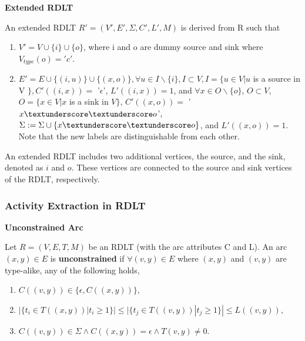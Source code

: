 \documentclass[12pt]{article}
\begin{document}
    \begin{definition} \textbf{Extended RDLT} \cite{malinao-rdlt}

    An extended RDLT $R' = (V',E',\Sigma,C',L',M)$ is derived from R such that

    \begin{enumerate}

        \item $V' = V \cup \{i\} \cup \{o\}$, where i and o are dummy source and sink where $V_{type}(o) = 'c'$.

        \item $E' = E \cup \{(i,u)\} \cup \{(x,o)\}, \forall u \in I\backslash \{i\}, I \subset V, I = \{u \in V | u$ is a source in V $\}, C'((i,x)) = $ '$\epsilon$', $L'((i,x)) = 1$, and $\forall x \in O\backslash \{o\}$, $O \subset V$, $O = \{x \in V | x$ is a sink in $V\}$, $C'((x,o)) = $ '$x\textunderscore \textunderscore o$', $\Sigma := \Sigma \cup \{x\textunderscore\textunderscore o\}$, and $L'((x,o)) = 1$. Note that the new labels are distinguishable from each other.

    \end{enumerate}

    \end{definition}

    An extended RDLT includes two additional vertices, the source, and the sink, denoted as $i$ and $o$. These vertices are connected to the source and sink vertices of the RDLT, respectively.

    \subsubsection*{Activity Extraction in RDLT}

    \begin{definition} \textbf{Unconstrained Arc} \cite{malinao-rdlt}

    Let $R = (V,E,T,M)$ be an RDLT (with the arc attributes C and L). An arc $(x,y) \in E$ is \textbf{unconstrained} if $\forall (v,y) \in E$ where $(x,y)$ and $(v,y)$ are type-alike, any of the following holds,

    \begin{enumerate}

        \item $C((v,y)) \in \{\epsilon,C((x,y))\}$,

        \item $|\{t_{i} \in T((x,y))|t_{i} \geq 1\}|\leq |\{t_{j} \in T((v,y))|t_{j} \geq 1\}| \leq L((v,y))$,

        \item $C((v,y)) \in \Sigma \wedge C((x,y)) = \epsilon \wedge T(v,y) \neq 0$.

    \end{enumerate}

    \end{definition}
\end{document}
